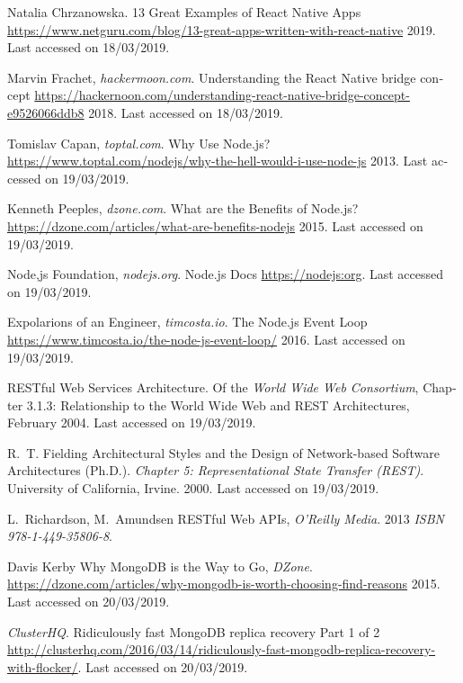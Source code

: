 \begin{thebibliography}{1}
\bibitem{[RN3]} {\textlatin{
{Natalia Chrzanowska}.
 13 Great Examples of React Native Apps
\url{https://www.netguru.com/blog/13-great-apps-written-with-react-native}
  2019. Last accessed on 18/03/2019}}.
  
\bibitem{[RN4]} {\textlatin{
{Marvin Frachet, {\em hackermoon.com}}.
Understanding the React Native bridge concept
\url{https://hackernoon.com/understanding-react-native-bridge-concept-e9526066ddb8}
  2018. Last accessed on 18/03/2019}}.
  
\bibitem{[NODE1]} {\textlatin{
{Tomislav Capan, {\em toptal.com}}.
Why Use Node.js?
\url{https://www.toptal.com/nodejs/why-the-hell-would-i-use-node-js}
  2013. Last accessed on 19/03/2019}}.
  
\bibitem{[NODE2]} {\textlatin{
{Kenneth Peeples, {\em dzone.com}}.
What are the Benefits of Node.js?
\url{https://dzone.com/articles/what-are-benefits-nodejs}
  2015. Last accessed on 19/03/2019}}.
  
\bibitem{[NODE3]} {\textlatin{
{Node,js Foundation, {\em nodejs.org}}.
Node.js Docs
\url{https://nodejs:org}. Last accessed on 19/03/2019}}.
  
\bibitem{[NODE4]} {\textlatin{
{Expolarions of an Engineer, {\em timcosta.io}}.
The Node.js Event Loop
\url{https://www.timcosta.io/the-node-js-event-loop/}
  2016. Last accessed on 19/03/2019}}.

\bibitem{[REST1]} {\textlatin{
RESTful Web Services Architecture.
Of the {\em World Wide Web Consortium}, Chapter 3.1.3: Relationship to the World Wide Web and REST Architectures, February 2004. Last accessed on 19/03/2019}}.

\bibitem{[REST2]} {\textlatin{
{R.~T. Fielding}
Architectural Styles and the Design of Network-based Software Architectures (Ph.D.). { \em Chapter 5: Representational State Transfer (REST)}. University of California, Irvine. 2000. Last accessed on 19/03/2019}}.

\bibitem{[REST3]} {\textlatin{
{L.~Richardson, M.~Amundsen}
RESTful Web APIs, { \em O'Reilly Media}. 2013 {\em ISBN 978-1-449-35806-8}}}.

\bibitem{[MONGO1]} {\textlatin{
{Davis Kerby}
Why MongoDB is the Way to Go, {\em DZone}.
\url{https://dzone.com/articles/why-mongodb-is-worth-choosing-find-reasons}
  2015. Last accessed on 20/03/2019}}.

\bibitem{[MONGO2]} {\textlatin{
{{\em ClusterHQ}}.
Ridiculously fast MongoDB replica recovery Part 1 of 2
\url{http://clusterhq.com/2016/03/14/ridiculously-fast-mongodb-replica-recovery-with-flocker/}. Last accessed on 20/03/2019}}.


\end{thebibliography}
